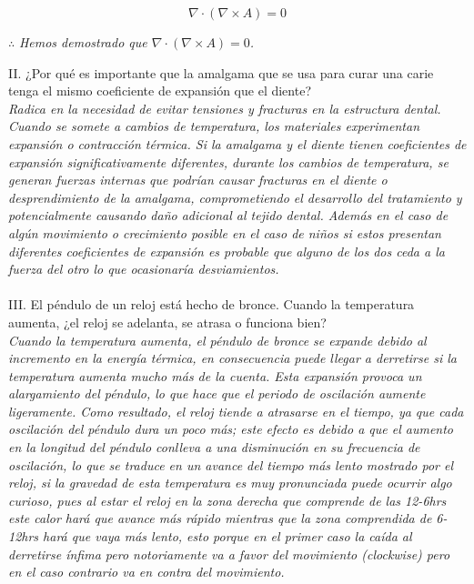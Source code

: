 \documentclass{article}
\begin{document}
$$
\nabla \cdot (\nabla \times A) = 0
$$

$\therefore$ \textit{Hemos demostrado que $ \nabla \cdot (\nabla \times A) = 0 $. \\}

II. ¿Por qué es importante que la amalgama que se usa para curar una carie tenga el mismo
coeficiente de expansión que el diente? \\
\textit{Radica en la necesidad de evitar tensiones y fracturas en la estructura dental. Cuando se somete a cambios de temperatura, los materiales experimentan expansión o contracción térmica. Si la amalgama y el diente tienen coeficientes de expansión significativamente diferentes, durante los cambios de temperatura, se generan fuerzas internas que podrían causar fracturas en el diente o desprendimiento de la amalgama, comprometiendo el desarrollo del tratamiento y potencialmente causando daño adicional al tejido dental. Además en el caso de algún movimiento o crecimiento posible en el caso de niños si estos presentan diferentes coeficientes de expansión es probable que alguno de los dos ceda a la fuerza del otro lo que ocasionaría desviamientos.}\\\\

III. El péndulo de un reloj está hecho de bronce. Cuando la temperatura aumenta, ¿el reloj se
adelanta, se atrasa o funciona bien? \\
\textit{Cuando la temperatura aumenta, el péndulo de bronce se expande debido al incremento en la energía térmica, en consecuencia puede llegar a derretirse si la temperatura aumenta mucho más de la cuenta. Esta expansión provoca un alargamiento del péndulo, lo que hace que el periodo de oscilación aumente ligeramente. Como resultado, el reloj tiende a atrasarse en el tiempo, ya que cada oscilación del péndulo dura un poco más; este efecto es debido a que el aumento en la longitud del péndulo conlleva a una disminución en su frecuencia de oscilación, lo que se traduce en un avance del tiempo más lento mostrado por el reloj, si la gravedad de esta temperatura es muy pronunciada puede ocurrir algo curioso, pues al estar el reloj en la zona derecha que comprende de las 12-6hrs este calor hará que avance más rápido mientras que la zona comprendida de 6-12hrs hará que vaya más lento, esto porque en el primer caso la caída al derretirse ínfima pero notoriamente va a favor del movimiento (clockwise) pero en el caso contrario va en contra del movimiento.} \\\\
\end{document}
